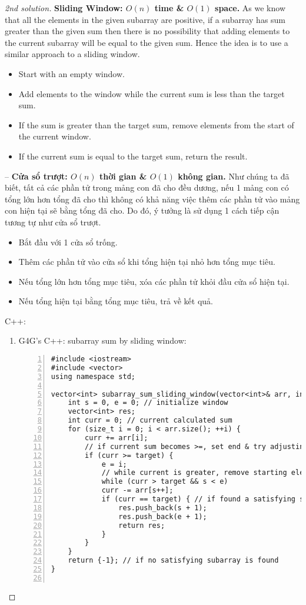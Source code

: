 \documentclass{article}
\begin{document}
\begin{proof}[2nd solution]
    {\bf Sliding Window: $O(n)$ time \& $O(1)$ space.} As we know that all the elements in the given subarray are positive, if a subarray has sum greater than the given sum then there is no possibility that adding elements to the current subarray will be equal to the given sum. Hence the idea is to use a similar approach to a sliding window.
    \begin{itemize}
        \item Start with an empty window.
        \item Add elements to the window while the current sum is less than the target sum.
        \item If the sum is greater than the target sum, remove elements from the start of the current window.
        \item If the current sum is equal to the target sum, return the result.
    \end{itemize}
    -- {\bf Cửa sổ trượt: $O(n)$ thời gian \& $O(1)$ không gian.} Như chúng ta đã biết, tất cả các phần tử trong mảng con đã cho đều dương, nếu 1 mảng con có tổng lớn hơn tổng đã cho thì không có khả năng việc thêm các phần tử vào mảng con hiện tại sẽ bằng tổng đã cho. Do đó, ý tưởng là sử dụng 1 cách tiếp cận tương tự như cửa sổ trượt.
    \begin{itemize}
        \item Bắt đầu với 1 cửa sổ trống.
        \item Thêm các phần tử vào cửa sổ khi tổng hiện tại nhỏ hơn tổng mục tiêu.
        \item Nếu tổng lớn hơn tổng mục tiêu, xóa các phần tử khỏi đầu cửa sổ hiện tại.
        \item Nếu tổng hiện tại bằng tổng mục tiêu, trả về kết quả.
    \end{itemize}
    C++:
    \begin{enumerate}
        \item G4G's C++: subarray sum by sliding window:
        \begin{Verbatim}[numbers=left,xleftmargin=5mm]
#include <iostream>
#include <vector>
using namespace std;

vector<int> subarray_sum_sliding_window(vector<int>& arr, int target) {
    int s = 0, e = 0; // initialize window
    vector<int> res;
    int curr = 0; // current calculated sum
    for (size_t i = 0; i < arr.size(); ++i) {
        curr += arr[i];
        // if current sum becomes >=, set end & try adjusting start
        if (curr >= target) {
            e = i;
            // while current is greater, remove starting elements of current window
            while (curr > target && s < e)
            curr -= arr[s++];
            if (curr == target) { // if found a satisfying subarray
                res.push_back(s + 1);
                res.push_back(e + 1);
                return res;
            }
        }
    }
    return {-1}; // if no satisfying subarray is found
}


\end{Verbatim}
\end{enumerate}
\end{proof}
\end{document}
